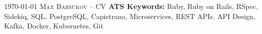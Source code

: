 
\makecvfooterwithkeywords
   {\textsc{\monthyeardate\today}}
   {\textsc{Max Barsukov -- CV}}
   {\thepage}
   {\textbf{ATS Keywords:} Ruby, Ruby on Rails, RSpec, Sidekiq, SQL, PostgreSQL, Capistrano,
                           Microservices, REST APIs, API Design, Kafka, Docker, Kubernetes, Git}
